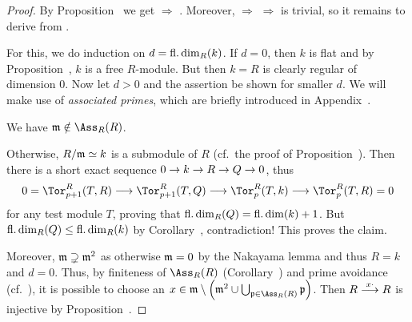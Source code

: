 \documentclass[a4paper,parskip=half,numbers=enddot, DIV=12]{scrreprt}
\begin{document}
\begin{proof}
	By Proposition~ we get  $\Rightarrow$ . Moreover,  $\Rightarrow$  $\Rightarrow$  is trivial, so it remains to derive  from .
	
	For this, we do induction on $d=\operatorname{fl.dim}_R(k)$. If $d=0$, then $k$ is flat and by Proposition~, $k$ is a free $R$-module. But then $k=R$ is clearly regular of dimension $0$. Now let $d>0$ and the assertion be shown for smaller $d$. We will make use of \emph{associated primes}, which are briefly introduced in Appendix~. 
	\begin{claim}
		We have $\mm\notin\Ass_R(R)$.
	\end{claim}
	Otherwise, $R/\mathfrak{m}\simeq k$ is a submodule of $R$ (cf.\ the proof of Proposition~). Then there is a short exact sequence $0\morphism k\morphism R\morphism Q\morphism 0$, thus
	\begin{align*}
		0=\Tor_{p+1}^R(T,R)\morphism\Tor_{p+1}^R(T,Q)\morphism\Tor_p^R(T,k)\morphism\Tor_p^R(T,R)=0
	\end{align*}
	for any test module $T$, proving that $\operatorname{fl.dim}_R(Q)=\operatorname{fl.dim} (k)+1$. But $\operatorname{fl.dim}_R(Q)\leq\operatorname{fl.dim}_R(k)$ by Corollary~, contradiction! This proves the claim.
	
	Moreover, $\mathfrak{m}\supsetneq\mathfrak{m}^2$ as otherwise $\mathfrak{m}=0$ by the Nakayama lemma and thus $R=k$ and $d=0$. Thus, by finiteness of $\Ass_R(R)$ (Corollary~) and prime avoidance (cf.\ \cite[Lemma~2.5.1]{alg1}), it is possible to choose an $x\in\mm\setminus \left(\mm^2\cup\bigcup_{\pp\in\Ass_R(R)}\pp\right)$. Then $R\morphism[x\cdot]R$ is injective by Proposition~. 
	

\end{proof}
\end{document}
